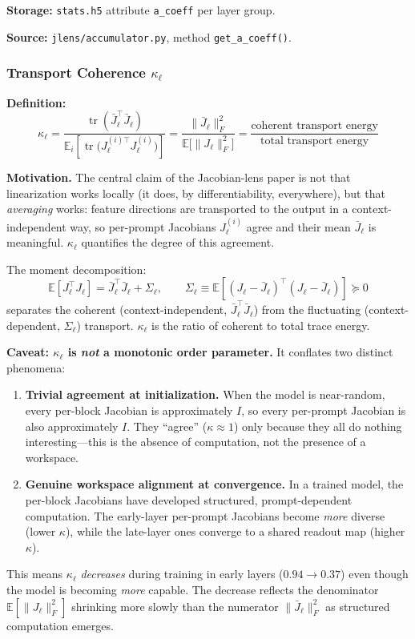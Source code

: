 \documentclass[11pt,a4paper]{article}
\begin{document}
\textbf{Storage:} \texttt{stats.h5} attribute \texttt{a\_coeff} per layer group.

\textbf{Source:} \texttt{jlens/accumulator.py}, method \texttt{get\_a\_coeff()}.

\subsubsection{Transport Coherence $\kappa_\ell$}
\label{sec:coherence}

\textbf{Definition:}
\begin{equation}
  \kappa_\ell = \frac{\operatorname{tr}(\bar{J}_\ell^\top \bar{J}_\ell)}{\mathbb{E}_i\left[\operatorname{tr}\!\big(J^{(i)\top}_\ell J^{(i)}_\ell\big)\right]}
  = \frac{\|\bar{J}_\ell\|_F^2}{\mathbb{E}\big[\|J_\ell\|_F^2\big]}
  = \frac{\text{coherent transport energy}}{\text{total transport energy}}
\end{equation}

\textbf{Motivation.} The central claim of the Jacobian-lens paper is not that linearization works locally (it does, by differentiability, everywhere), but that \emph{averaging} works: feature directions are transported to the output in a context-independent way, so per-prompt Jacobians $J_\ell^{(i)}$ agree and their mean $\bar{J}_\ell$ is meaningful. $\kappa_\ell$ quantifies the degree of this agreement.

The moment decomposition:
\begin{equation}
  \mathbb{E}[J_\ell^\top J_\ell] = \bar{J}_\ell^\top \bar{J}_\ell + \Sigma_\ell,
  \qquad
  \Sigma_\ell \equiv \mathbb{E}\left[(J_\ell - \bar{J}_\ell)^\top (J_\ell - \bar{J}_\ell)\right] \succeq 0
\end{equation}
separates the coherent (context-independent, $\bar{J}_\ell^\top \bar{J}_\ell$) from the fluctuating (context-dependent, $\Sigma_\ell$) transport. $\kappa_\ell$ is the ratio of coherent to total trace energy.

\textbf{Caveat: $\kappa_\ell$ is \emph{not} a monotonic order parameter.} It conflates two distinct phenomena:
\begin{enumerate}
  \item \textbf{Trivial agreement at initialization.} When the model is near-random, every per-block Jacobian is approximately $I$, so every per-prompt Jacobian is also approximately $I$. They ``agree'' ($\kappa \approx 1$) only because they all do nothing interesting---this is the absence of computation, not the presence of a workspace.
  \item \textbf{Genuine workspace alignment at convergence.} In a trained model, the per-block Jacobians have developed structured, prompt-dependent computation. The early-layer per-prompt Jacobians become \emph{more} diverse (lower $\kappa$), while the late-layer ones converge to a shared readout map (higher $\kappa$).
\end{enumerate}
This means $\kappa_\ell$ \emph{decreases} during training in early layers ($0.94 \to 0.37$) even though the model is becoming \emph{more} capable. The decrease reflects the denominator $\mathbb{E}[\|J_\ell\|_F^2]$ shrinking more slowly than the numerator $\|\bar{J}_\ell\|_F^2$ as structured computation emerges.
\end{document}
